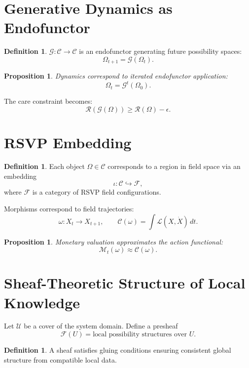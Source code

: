 \documentclass[11pt,a4paper]{article}
\newtheorem{proposition}[theorem]{Proposition}
\theoremstyle{definition}
\newtheorem{definition}[theorem]{Definition}
\theoremstyle{remark}
\begin{document}
\section{Generative Dynamics as Endofunctor}

\begin{definition}
$\mathcal{G} : \mathcal{C} \to \mathcal{C}$ is an endofunctor generating future possibility spaces:
\[
\Omega_{t+1} = \mathcal{G}(\Omega_t).
\]
\end{definition}

\begin{proposition}
Dynamics correspond to iterated endofunctor application:
\[
\Omega_t = \mathcal{G}^t(\Omega_0).
\]
\end{proposition}

The care constraint becomes:
\[
\mathcal{R}(\mathcal{G}(\Omega)) \geq \mathcal{R}(\Omega) - \epsilon.
\]

\section{RSVP Embedding}

\begin{definition}
Each object $\Omega \in \mathcal{C}$ corresponds to a region in field space via an embedding
\[
\iota : \mathcal{C} \hookrightarrow \mathcal{F},
\]
where $\mathcal{F}$ is a category of RSVP field configurations.
\end{definition}

Morphisms correspond to field trajectories:
\[
\omega : X_t \to X_{t+1}, \qquad \mathcal{C}(\omega) = \int \mathcal{L}(X, \dot{X})\, dt.
\]

\begin{proposition}
Monetary valuation approximates the action functional:
\[
\mathcal{M}_t(\omega) \approx \mathcal{C}(\omega).
\]
\end{proposition}

\section{Sheaf-Theoretic Structure of Local Knowledge}

Let $\mathcal{U}$ be a cover of the system domain. Define a presheaf
\[
\mathcal{F}(U) = \text{local possibility structures over } U.
\]

\begin{definition}
A sheaf satisfies gluing conditions ensuring consistent global structure from compatible local data.
\end{definition}
\end{document}
